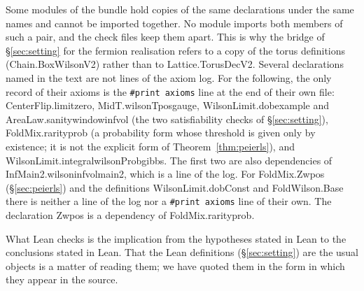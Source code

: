 \documentclass[11pt,a4paper]{article}
\theoremstyle{definition}
\theoremstyle{remark}
\newcommand{\leanus}{\textunderscore\allowbreak{}}
\newcommand{\leandot}{.\allowbreak{}}
\newcommand{\lean}[1]{{\ttfamily\let\_\leanus #1}}
\begin{document}
Some modules of the bundle hold copies of the same declarations under the same names and cannot be imported together. No module imports both members of such a pair, and the check files keep them apart. This is why the bridge of \S\ref{sec:setting} for the fermion realisation refers to a copy of the torus definitions (\lean{Chain\leandot{}BoxWilsonV2}) rather than to \lean{Lattice\leandot{}TorusDecV2}. Several declarations named in the text are not lines of the axiom log. For the following, the only record of their axioms is the \texttt{\#print axioms} line at the end of their own file: \lean{CenterFlip\leandot{}limit\_zero}, \lean{MidT\leandot{}wilson\_Tpos\_gauge}, \lean{WilsonLimit\leandot{}dob\_example} and \lean{AreaLaw\leandot{}sanity\_window\_infvol} (the two satisfiability checks of \S\ref{sec:setting}), \lean{FoldMix\leandot{}rarity\_prob} (a probability form whose threshold is given only by existence; it is not the explicit form of Theorem~\ref{thm:peierls}), and \lean{WilsonLimit\leandot{}integral\_wilsonProb\_gibbs}. The first two are also dependencies of \lean{InfMain2\leandot{}wilson\_infvol\_main2}, which is a line of the log. For \lean{FoldMix\leandot{}Zw\_pos} (\S\ref{sec:peierls}) and the definitions \lean{WilsonLimit\leandot{}dobConst} and \lean{FoldWilson\leandot{}Base} there is neither a line of the log nor a \texttt{\#print axioms} line of their own. The declaration \lean{Zw\_pos} is a dependency of \lean{FoldMix\leandot{}rarity\_prob}.

What Lean checks is the implication from the hypotheses stated in Lean to the conclusions stated in Lean. That the Lean definitions (\S\ref{sec:setting}) are the usual objects is a matter of reading them; we have quoted them in the form in which they appear in the source.
\end{document}
